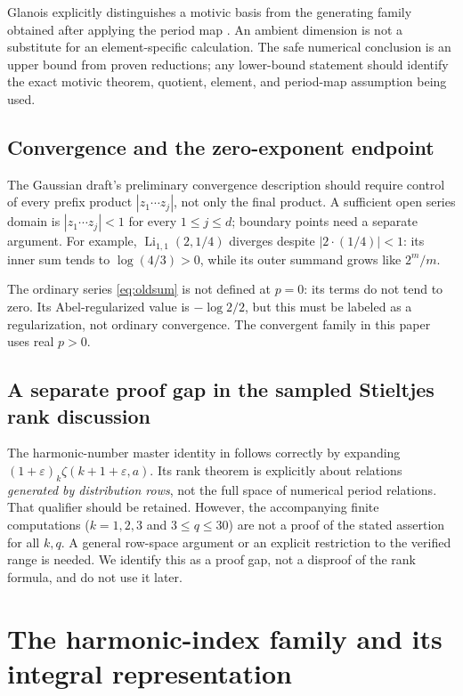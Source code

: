 \documentclass[11pt]{article}
\numberwithin{equation}{section}
\theoremstyle{definition}\newtheorem{definition}[theorem]{Definition}
\theoremstyle{remark}\newtheorem{remark}[theorem]{Remark}
\DeclareMathOperator{\Li}{Li}
\begin{document}
Glanois explicitly distinguishes a motivic basis from the generating family obtained after applying the period map \cite{Glanois}. An ambient dimension is not a substitute for an element-specific calculation. The safe numerical conclusion is an upper bound from proven reductions; any lower-bound statement should identify the exact motivic theorem, quotient, element, and period-map assumption being used.

\subsection{Convergence and the zero-exponent endpoint}
The Gaussian draft's preliminary convergence description should require control of every prefix product $|z_1\cdots z_j|$, not only the final product. A sufficient open series domain is
$|z_1\cdots z_j|<1$ for every $1\le j\le d$; boundary points need a separate argument. For example, $\Li_{1,1}(2,1/4)$ diverges despite $|2\cdot(1/4)|<1$: its inner sum tends to $\log(4/3)>0$, while its outer summand grows like $2^m/m$.

The ordinary series \eqref{eq:oldsum} is not defined at $p=0$: its terms do not tend to zero. Its Abel-regularized value is $-\log2/2$, but this must be labeled as a regularization, not ordinary convergence. The convergent family in this paper uses real $p>0$.

\subsection{A separate proof gap in the sampled Stieltjes rank discussion}
The harmonic-number master identity in \cite{repoStieltjes} follows correctly by expanding $(1+\varepsilon)_k\zeta(k+1+\varepsilon,a)$. Its rank theorem is explicitly about relations \emph{generated by distribution rows}, not the full space of numerical period relations. That qualifier should be retained. However, the accompanying finite computations ($k=1,2,3$ and $3\le q\le30$) are not a proof of the stated assertion for all $k,q$. A general row-space argument or an explicit restriction to the verified range is needed. We identify this as a proof gap, not a disproof of the rank formula, and do not use it later.

\section{The harmonic-index family and its integral representation}
\label{sec:family}
\end{document}

